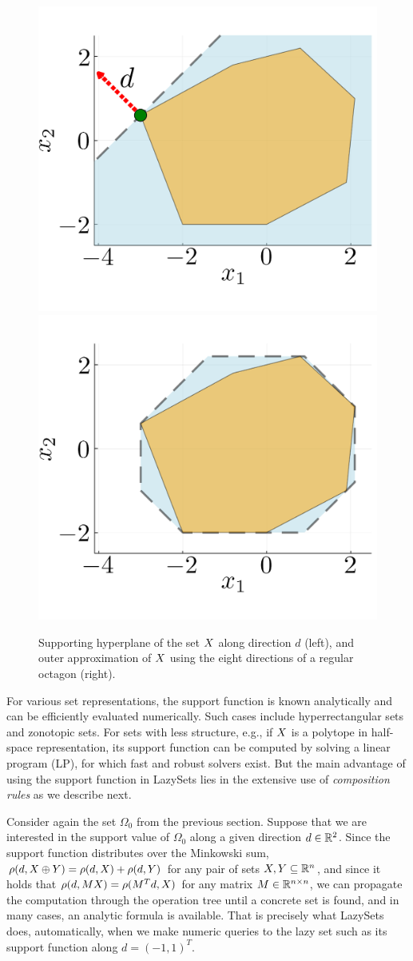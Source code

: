 \begin{figure}
	\centering
	\includegraphics[width=0.49\linewidth, keepaspectratio]{img/supfunc}
	\includegraphics[width=0.49\linewidth, keepaspectratio]{img/supfunc_oct}
	\vspace*{1mm}
	\caption{Supporting hyperplane of the set $X$ along direction $d$ (left), and outer approximation of $X$ using the eight directions of a regular octagon (right).}
	\label{fig:supfunc}
\end{figure}

For various set representations, the support function is known analytically and can be efficiently evaluated numerically. Such cases include hyperrectangular sets and zonotopic sets.
%
For sets with less structure, e.g., if $X$ is a polytope in half-space representation, its support function can be computed by solving a linear program (LP), for which fast and robust solvers exist.
%
But the main advantage of using the support function in LazySets lies in the extensive use of \emph{composition rules} as we describe next.

\smallskip

Consider again the set $\Omega_0$ from the previous section. Suppose that we are interested in the support value of $\Omega_0$ along a given direction $d \in \mathbb{R}^2$.
%
Since the support function distributes over the Minkowski sum, $\rho(d, X \oplus Y) = \rho(d, X) + \rho(d, Y)$ for any pair of sets $X, Y \subseteq \mathbb{R}^n$, and since it holds that $\rho(d, M X) = \rho(M^T d, X)$ for any matrix $M \in \mathbb{R}^{n \times n}$, we can propagate the computation through the operation tree until a concrete set is found, and in many cases, an analytic formula is available.
%
That is precisely what LazySets does, automatically, when we make numeric queries to the lazy set such as its support function along $d = (-1, 1)^T$.

